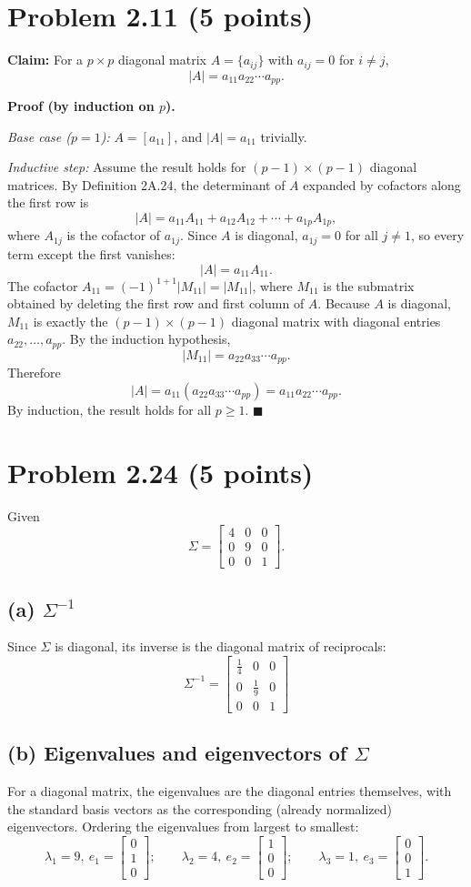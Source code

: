 \documentclass[11pt]{article}
\newcommand{\mat}[1]{\begin{bmatrix} #1 \end{bmatrix}}
\begin{document}
\section*{Problem 2.11 (5 points)}

\textbf{Claim:} For a $p\times p$ diagonal matrix $A=\{a_{ij}\}$ with $a_{ij}=0$ for $i\neq j$,
\[
|A| = a_{11}a_{22}\cdots a_{pp}.
\]

\textbf{Proof (by induction on $p$).}

\emph{Base case ($p=1$):} $A=[a_{11}]$, and $|A| = a_{11}$ trivially.

\emph{Inductive step:} Assume the result holds for $(p-1)\times(p-1)$ diagonal matrices. By Definition 2A.24, the determinant of $A$ expanded by cofactors along the first row is
\[
|A| = a_{11}A_{11} + a_{12}A_{12} + \cdots + a_{1p}A_{1p},
\]
where $A_{1j}$ is the cofactor of $a_{1j}$. Since $A$ is diagonal, $a_{1j}=0$ for all $j\neq 1$, so every term except the first vanishes:
\[
|A| = a_{11}A_{11}.
\]
The cofactor $A_{11} = (-1)^{1+1}|M_{11}| = |M_{11}|$, where $M_{11}$ is the submatrix obtained by deleting the first row and first column of $A$. Because $A$ is diagonal, $M_{11}$ is exactly the $(p-1)\times(p-1)$ diagonal matrix with diagonal entries $a_{22},\dots,a_{pp}$. By the induction hypothesis,
\[
|M_{11}| = a_{22}a_{33}\cdots a_{pp}.
\]
Therefore
\[
|A| = a_{11}(a_{22}a_{33}\cdots a_{pp}) = a_{11}a_{22}\cdots a_{pp}.
\]
By induction, the result holds for all $p\geq 1$. \qquad $\blacksquare$

\section*{Problem 2.24 (5 points)}

Given
\[
\Sigma = \mat{4&0&0\\0&9&0\\0&0&1}.
\]

\subsection*{(a) $\Sigma^{-1}$}
Since $\Sigma$ is diagonal, its inverse is the diagonal matrix of reciprocals:
\[
\Sigma^{-1} = \mat{\tfrac14&0&0\\0&\tfrac19&0\\0&0&1}
\]

\subsection*{(b) Eigenvalues and eigenvectors of $\Sigma$}
For a diagonal matrix, the eigenvalues are the diagonal entries themselves, with the standard basis vectors as the corresponding (already normalized) eigenvectors. Ordering the eigenvalues from largest to smallest:
\[
\lambda_1 = 9,\ e_1 = \mat{0\\1\\0}; \qquad
\lambda_2 = 4,\ e_2 = \mat{1\\0\\0}; \qquad
\lambda_3 = 1,\ e_3 = \mat{0\\0\\1}.
\]
\end{document}
